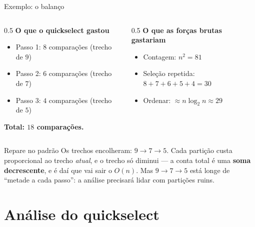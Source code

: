 \documentclass[aspectratio=169]{beamer}
\begin{document}
\begin{frame}[shrink=20]{Exemplo: o balanço}
  \begin{columns}[T]
    \begin{column}{0.5\textwidth}
      \textbf{O que o quickselect gastou}
      \begin{itemize}
        \item Passo 1: $8$ comparações (trecho de $9$)
        \item Passo 2: $6$ comparações (trecho de $7$)
        \item Passo 3: $4$ comparações (trecho de $5$)
      \end{itemize}
      \medskip
      \textbf{Total: $18$ comparações.}
    \end{column}
    \begin{column}{0.5\textwidth}
      \textbf{O que as forças brutas gastariam}
      \begin{itemize}
        \item Contagem: $n^2 = 81$
        \item Seleção repetida: $8{+}7{+}6{+}5{+}4 = 30$
        \item Ordenar: $\approx n\log_2 n \approx 29$
      \end{itemize}
    \end{column}
  \end{columns}

  \begin{block}{Repare no padrão}
    Os trechos encolheram: $9 \to 7 \to 5$. Cada partição custa proporcional ao
    trecho \emph{atual}, e o trecho só diminui --- a conta total é uma
    \textbf{soma decrescente}, e é daí que vai sair o $O(n)$.
    Mas $9 \to 7 \to 5$ está longe de ``metade a cada passo'': a análise
    precisará lidar com partições ruins.
  \end{block}
\end{frame}

\section{Análise do quickselect}
\end{document}

